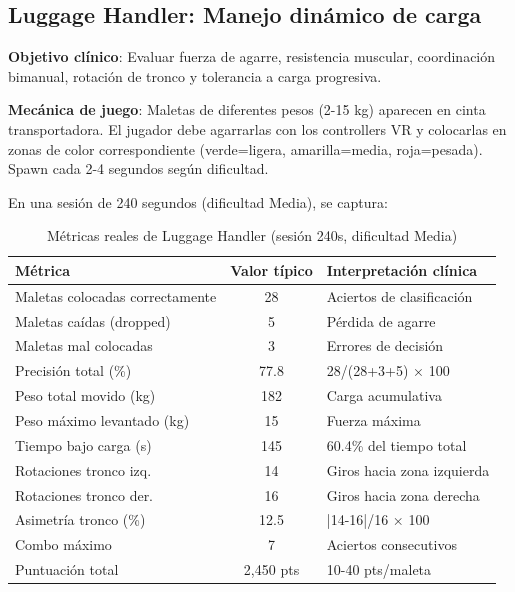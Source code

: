 \subsection{Luggage Handler: Manejo dinámico de carga}

\textbf{Objetivo clínico}: Evaluar fuerza de agarre, resistencia muscular, coordinación bimanual, rotación de tronco y tolerancia a carga progresiva.

\textbf{Mecánica de juego}: Maletas de diferentes pesos (2-15 kg) aparecen en cinta transportadora. El jugador debe agarrarlas con los controllers VR y colocarlas en zonas de color correspondiente (verde=ligera, amarilla=media, roja=pesada). Spawn cada 2-4 segundos según dificultad.

En una sesión de 240 segundos (dificultad Media), se captura:

\begin{table}[h]
\centering
\begin{tabular}{|l|c|l|}
\hline
\textbf{Métrica} & \textbf{Valor típico} & \textbf{Interpretación clínica} \\ \hline
Maletas colocadas correctamente & 28 & Aciertos de clasificación \\ \hline
Maletas caídas (dropped) & 5 & Pérdida de agarre \\ \hline
Maletas mal colocadas & 3 & Errores de decisión \\ \hline
Precisión total (\%) & 77.8 & 28/(28+3+5) × 100 \\ \hline
Peso total movido (kg) & 182 & Carga acumulativa \\ \hline
Peso máximo levantado (kg) & 15 & Fuerza máxima \\ \hline
Tiempo bajo carga (s) & 145 & 60.4\% del tiempo total \\ \hline
Rotaciones tronco izq. & 14 & Giros hacia zona izquierda \\ \hline
Rotaciones tronco der. & 16 & Giros hacia zona derecha \\ \hline
Asimetría tronco (\%) & 12.5 & |14-16|/16 × 100 \\ \hline
Combo máximo & 7 & Aciertos consecutivos \\ \hline
Puntuación total & 2,450 pts & 10-40 pts/maleta \\ \hline
\end{tabular}
\caption{Métricas reales de Luggage Handler (sesión 240s, dificultad Media)}
\label{tab:luggage-metrics}
\end{table}

